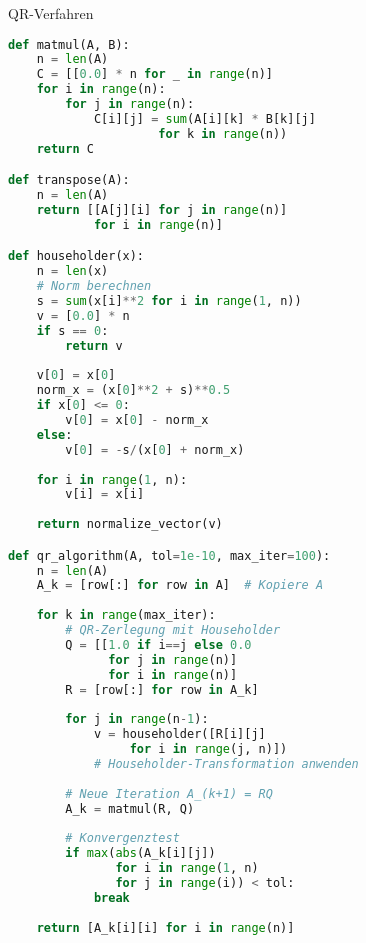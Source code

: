 \begin{examplecode}{QR-Verfahren}
\begin{lstlisting}[language=Python, style=basesmol]
def matmul(A, B):
    n = len(A)
    C = [[0.0] * n for _ in range(n)]
    for i in range(n):
        for j in range(n):
            C[i][j] = sum(A[i][k] * B[k][j] 
                     for k in range(n))
    return C

def transpose(A):
    n = len(A)
    return [[A[j][i] for j in range(n)] 
            for i in range(n)]

def householder(x):
    n = len(x)
    # Norm berechnen
    s = sum(x[i]**2 for i in range(1, n))
    v = [0.0] * n
    if s == 0:
        return v
    
    v[0] = x[0]
    norm_x = (x[0]**2 + s)**0.5
    if x[0] <= 0:
        v[0] = x[0] - norm_x
    else:
        v[0] = -s/(x[0] + norm_x)
    
    for i in range(1, n):
        v[i] = x[i]
    
    return normalize_vector(v)

def qr_algorithm(A, tol=1e-10, max_iter=100):
    n = len(A)
    A_k = [row[:] for row in A]  # Kopiere A
    
    for k in range(max_iter):
        # QR-Zerlegung mit Householder
        Q = [[1.0 if i==j else 0.0 
              for j in range(n)] 
              for i in range(n)]
        R = [row[:] for row in A_k]
        
        for j in range(n-1):
            v = householder([R[i][j] 
                 for i in range(j, n)])
            # Householder-Transformation anwenden
            
        # Neue Iteration A_(k+1) = RQ
        A_k = matmul(R, Q)
        
        # Konvergenztest
        if max(abs(A_k[i][j]) 
               for i in range(1, n) 
               for j in range(i)) < tol:
            break
    
    return [A_k[i][i] for i in range(n)]
\end{lstlisting}
\end{examplecode}

